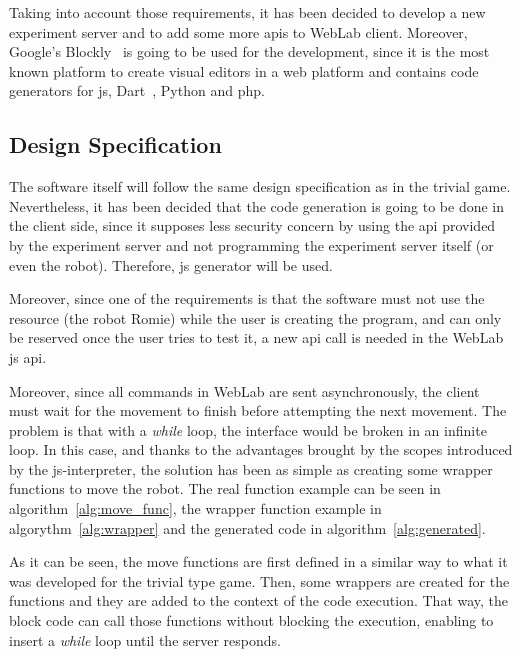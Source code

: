 Taking into account those requirements, it has been decided to develop a new experiment server and
to add some more \acrshort{api}s to WebLab client. Moreover, Google's Blockly~\cite{blockly} is
going to be used for the development, since it is the most known platform to create visual editors
in a web platform and contains code generators for \acrlong{js}, Dart~\cite{dart}, Python and
\acrshort{php}.

\subsection{Design Specification}

The software itself will follow the same design specification as in the trivial game. Nevertheless,
it has been decided that the code generation is going to be done in the client side, since it
supposes less security concern by using the \acrshort{api} provided by the experiment server and not
programming the experiment server itself (or even the robot). Therefore, \acrlong{js} generator will
be used.

Moreover, since one of the requirements is that the software must not use the resource (the robot
Romie) while the user is creating the program, and can only be reserved once the user tries to test
it, a new \acrshort{api} call is needed in the WebLab \acrlong{js} \acrshort{api}.

Moreover, since all commands in WebLab are sent asynchronously, the client must wait for the
movement to finish before attempting the next movement. The problem is that with a \emph{while}
loop, the interface would be broken in an infinite loop. In this case, and thanks to the advantages
brought by the scopes introduced by the \acrshort{js}-interpreter, the solution has been as simple
as creating some wrapper functions to move the robot. The real function example can be seen in
algorithm~\ref{alg:move_func}, the wrapper function example in algorythm~\ref{alg:wrapper} and the
generated code in algorithm~\ref{alg:generated}.

As it can be seen, the move functions are first defined in a similar way to what it was developed
for the trivial type game. Then, some wrappers are created for the functions and they are added to
the context of the code execution. That way, the block code can call those functions without
blocking the execution, enabling to insert a \emph{while} loop until the server responds.

